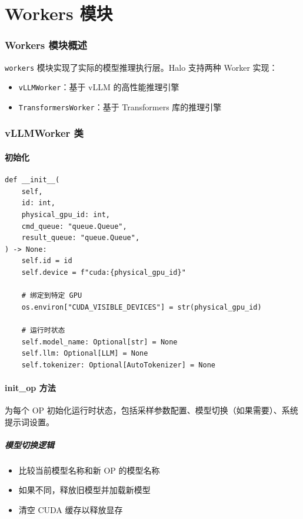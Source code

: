 \documentclass[12pt,a4paper]{article}
\begin{document}
\part{Workers 模块}

\section{Workers 模块概述}

\texttt{workers} 模块实现了实际的模型推理执行层。Halo 支持两种 Worker 实现：
\begin{itemize}
    \item \texttt{vLLMWorker}：基于 vLLM 的高性能推理引擎
    \item \texttt{TransformersWorker}：基于 Transformers 库的推理引擎
\end{itemize}

\section{vLLMWorker 类}

\subsection{初始化}

\begin{lstlisting}
def __init__(
    self,
    id: int,
    physical_gpu_id: int,
    cmd_queue: "queue.Queue",
    result_queue: "queue.Queue",
) -> None:
    self.id = id
    self.device = f"cuda:{physical_gpu_id}"
    
    # 绑定到特定 GPU
    os.environ["CUDA_VISIBLE_DEVICES"] = str(physical_gpu_id)
    
    # 运行时状态
    self.model_name: Optional[str] = None
    self.llm: Optional[LLM] = None
    self.tokenizer: Optional[AutoTokenizer] = None
\end{lstlisting}

\subsection{init\_op 方法}

为每个 OP 初始化运行时状态，包括采样参数配置、模型切换（如果需要）、系统提示词设置。

\subsubsection{模型切换逻辑}

\begin{itemize}
    \item 比较当前模型名称和新 OP 的模型名称
    \item 如果不同，释放旧模型并加载新模型
    \item 清空 CUDA 缓存以释放显存
\end{itemize}
\end{document}
